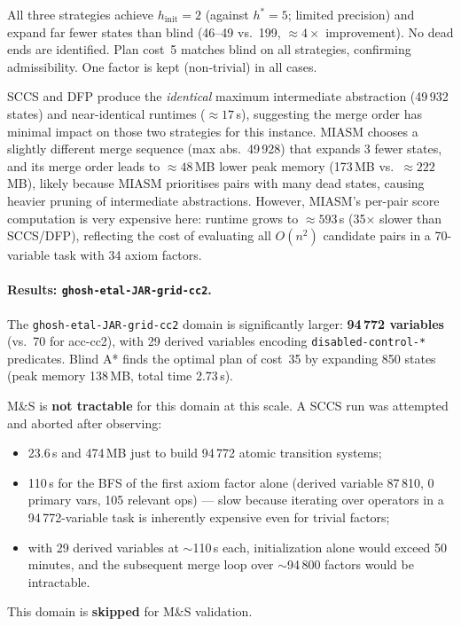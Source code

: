 \documentclass[11pt,a4paper]{article}
\begin{document}
\begin{itemize}
    All three strategies achieve $h_{\mathrm{init}} = 2$ (against $h^* =
    5$; limited precision) and expand far fewer states than blind (46--49
    vs.\ 199, $\approx 4\times$ improvement).  No dead ends are
    identified.  Plan cost~5 matches blind on all strategies, confirming
    admissibility.  One factor is kept (non-trivial) in all cases.

    SCCS and DFP produce the \emph{identical} maximum intermediate
    abstraction (49\,932 states) and near-identical runtimes ($\approx
    17$\,s), suggesting the merge order has minimal impact on those two
    strategies for this instance.  MIASM chooses a slightly different
    merge sequence (max abs.\ 49\,928) that expands 3 fewer states, and
    its merge order leads to $\approx 48$\,MB lower peak memory (173\,MB
    vs.\ $\approx 222$\,MB), likely because MIASM prioritises pairs with
    many dead states, causing heavier pruning of intermediate abstractions.
    However, MIASM's per-pair score computation is very expensive here:
    runtime grows to $\approx 593$\,s (35$\times$ slower than SCCS/DFP),
    reflecting the cost of evaluating all $O(n^2)$ candidate pairs in a
    70-variable task with 34 axiom factors.

    \paragraph{Results: \texttt{ghosh-etal-JAR-grid-cc2}.}

    The \texttt{ghosh-etal-JAR-grid-cc2} domain is significantly larger:
    \textbf{94\,772 variables} (vs.\ 70 for acc-cc2), with 29 derived
    variables encoding \texttt{disabled-control-*} predicates.  Blind
    A* finds the optimal plan of cost~35 by expanding 850 states (peak
    memory 138\,MB, total time 2.73\,s).

    M\&S is \textbf{not tractable} for this domain at this scale.  A
    SCCS run was attempted and aborted after observing:
    \begin{itemize}
      \item 23.6\,s and 474\,MB just to build 94\,772 atomic transition
            systems;
      \item 110\,s for the BFS of the first axiom factor alone
            (derived variable 87\,810, 0 primary vars, 105 relevant ops)
            — slow because iterating over operators in a 94\,772-variable
            task is inherently expensive even for trivial factors;
      \item with 29 derived variables at $\sim$110\,s each, initialization
            alone would exceed 50 minutes, and the subsequent merge loop
            over $\sim$94\,800 factors would be intractable.
    \end{itemize}
    This domain is \textbf{skipped} for M\&S validation.


\end{itemize}
\end{document}

